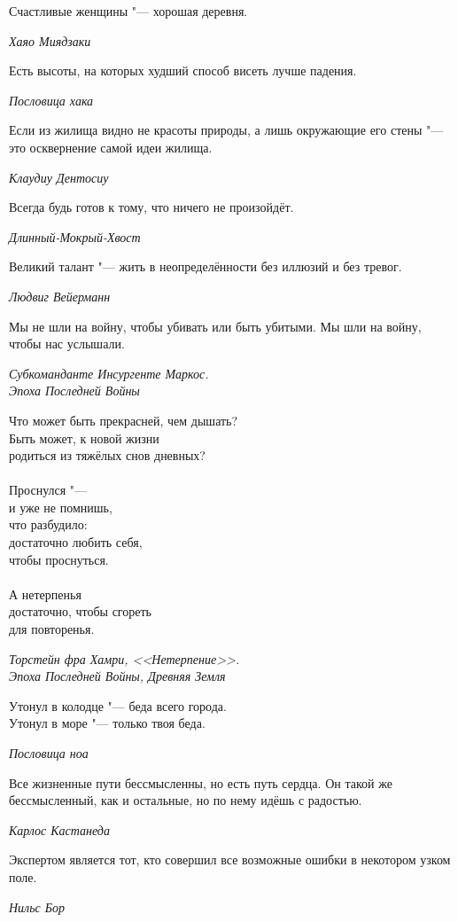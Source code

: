 \documentclass[a4paper,10pt]{book}
\newcommand{\mulang}[3]{#2}%
\begin{document}
\epigraph{\mulang{}{Счастливые женщины "--- хорошая деревня.}{Happy women mean 
a healthy village.}}
{\textit{Хаяо Миядзаки}}

\epigraph{\mulang{}{Есть высоты, на которых худший способ висеть лучше падения.}
{There are some heights, where the worst way to hang on is better than to fall 
off.}}
{\textit{Пословица хака}}

\epigraph{Если из жилища видно не красоты природы, а лишь окружающие его стены 
"--- это осквернение самой идеи жилища.}
{\textit{Клаудиу Дентосиу}}

\epigraph{\mulang{}{Всегда будь готов к тому, что ничего не произойдёт.}{Always 
expect nothing to happen.}}
{\textit{Длинный-Мокрый-Хвост}}

\epigraph{Великий талант "--- жить в неопределённости без иллюзий и без тревог.}
{\textit{Людвиг Вейерманн}}

\epigraph{Мы не шли на войну, чтобы убивать или быть убитыми. Мы шли на войну, 
чтобы нас услышали.}
{\textit{Субкоманданте Инсургенте Маркос.\\Эпоха Последней Войны}}

\epigraph{Что может быть прекрасней, чем дышать?\\
Быть может, к новой жизни\\
родиться из тяжёлых снов дневных?\\
~\\
Проснулся "---\\
и уже не помнишь,\\
что разбудило:\\
достаточно любить себя,\\
чтобы проснуться.\\
~\\
А нетерпенья\\
достаточно, чтобы сгореть\\
для повторенья.}
{\textit{Торстейн фра Хамри, <<Нетерпение>>.\\Эпоха Последней Войны, Древняя 
Земля}}

\epigraph{Утонул в колодце "--- беда всего города.\\
Утонул в море "--- только твоя беда.}
{\textit{Пословица ноа}}

\epigraph{Все жизненные пути бессмысленны, но есть путь сердца. 
Он такой же бессмысленный, как и остальные, но по нему идёшь с радостью.}
{\textit{Карлос Кастанеда}}


\epigraph{Экспертом является тот, кто совершил все возможные ошибки в некотором 
узком поле.}
{\textit{Нильс Бор}}
\end{document}
